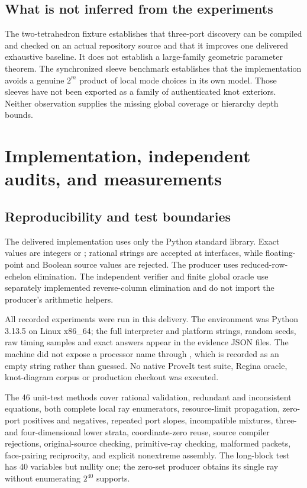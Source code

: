 \documentclass[11pt,a4paper]{article}
\theoremstyle{definition}
\theoremstyle{remark}
\begin{document}
\subsection{What is not inferred from the experiments}
The two-tetrahedron fixture establishes that three-port discovery can be compiled and checked on an actual repository source and that it improves one delivered exhaustive baseline. It does not establish a large-family geometric parameter theorem. The synchronized sleeve benchmark establishes that the implementation avoids a genuine $2^m$ product of local mode choices in its own model. Those sleeves have not been exported as a family of authenticated knot exteriors. Neither observation supplies the missing global coverage or hierarchy depth bounds.



\section{Implementation, independent audits, and measurements}
\label{sec:evidence}

\subsection{Reproducibility and test boundaries}
The delivered implementation uses only the Python standard library. Exact values are integers or ; rational strings are accepted at interfaces, while floating-point and Boolean source values are rejected. The producer uses reduced-row-echelon elimination. The independent verifier and finite global oracle use separately implemented reverse-column elimination and do not import the producer's arithmetic helpers.

All recorded experiments were run in this delivery. The environment was Python 3.13.5 on Linux x86\_64; the full interpreter and platform strings, random seeds, raw timing samples and exact answers appear in the evidence JSON files. The machine did not expose a processor name through , which is recorded as an empty string rather than guessed. No native ProveIt test suite, Regina oracle, knot-diagram corpus or production checkout was executed.

The 46 unit-test methods cover rational validation, redundant and inconsistent equations, both complete local ray enumerators, resource-limit propagation, zero-port positives and negatives, repeated port slopes, incompatible mixtures, three- and four-dimensional lower strata, coordinate-zero reuse, source compiler rejections, original-source checking, primitive-ray checking, malformed packets, face-pairing reciprocity, and explicit nonextreme assembly. The long-block test has 40 variables but nullity one; the zero-set producer obtains its single ray without enumerating $2^{40}$ supports.
\end{document}
